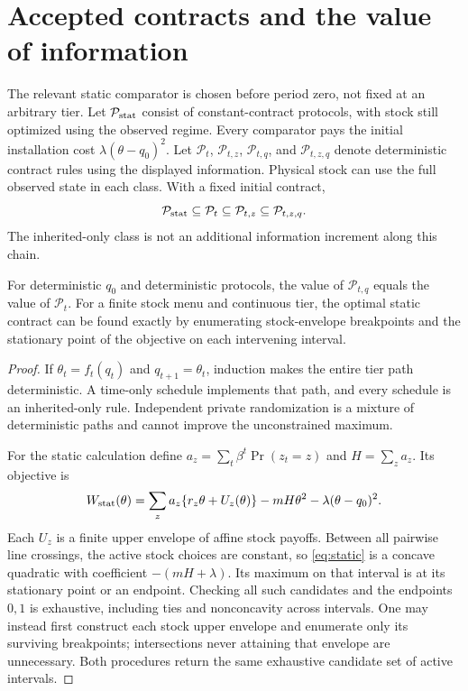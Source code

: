 \section{Accepted contracts and the value of information}\label{sec:accepted}
The relevant static comparator is chosen before period zero, not fixed at an arbitrary tier. Let $\mathcal P_{\rm stat}$ consist of constant-contract protocols, with stock still optimized using the observed regime. Every comparator pays the initial installation cost $\lambda(\theta-q_0)^2$. Let $\mathcal P_t$, $\mathcal P_{t,z}$, $\mathcal P_{t,q}$, and $\mathcal P_{t,z,q}$ denote deterministic contract rules using the displayed information. Physical stock can use the full observed state in each class. With a fixed initial contract,
\begin{equation}\label{eq:classes}
 \mathcal P_{\rm stat}\subseteq\mathcal P_t
 \subseteq\mathcal P_{t,z}\subseteq\mathcal P_{t,z,q}.
\end{equation}
The inherited-only class is not an additional information increment along this chain.
\begin{proposition}\label{prop:classes}
For deterministic $q_0$ and deterministic protocols, the value of $\mathcal P_{t,q}$ equals the value of $\mathcal P_t$. For a finite stock menu and continuous tier, the optimal static contract can be found exactly by enumerating stock-envelope breakpoints and the stationary point of the objective on each intervening interval.
\end{proposition}
\begin{proof}
If $\theta_t=f_t(q_t)$ and $q_{t+1}=\theta_t$, induction makes the entire tier path deterministic. A time-only schedule implements that path, and every schedule is an inherited-only rule. Independent private randomization is a mixture of deterministic paths and cannot improve the unconstrained maximum.

For the static calculation define $a_z=\sum_t\beta^t\Pr(z_t=z)$ and $H=\sum_z a_z$. Its objective is
\begin{equation}\label{eq:static}
 W_{\rm stat}(\theta)=\sum_z a_z\{r_z\theta+U_z(\theta)\}
             -mH\theta^2-\lambda(\theta-q_0)^2.
\end{equation}
Each $U_z$ is a finite upper envelope of affine stock payoffs. Between all pairwise line crossings, the active stock choices are constant, so \eqref{eq:static} is a concave quadratic with coefficient $-(mH+\lambda)$. Its maximum on that interval is at its stationary point or an endpoint. Checking all such candidates and the endpoints $0,1$ is exhaustive, including ties and nonconcavity across intervals. One may instead first construct each stock upper envelope and enumerate only its surviving breakpoints; intersections never attaining that envelope are unnecessary. Both procedures return the same exhaustive candidate set of active intervals.\end{proof}
